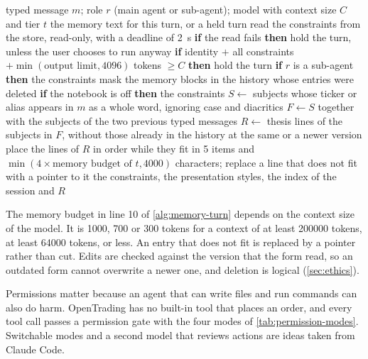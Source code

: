 \begin{algorithm}[H]
  \caption{Memory steps before the agent loop of one turn}\label{alg:memory-turn}
  \begin{algorithmic}[1]
    \Require typed message $m$; role $r$ (main agent or sub-agent); model with context size $C$ and tier $t$
    \Ensure the memory text for this turn, or a held turn
    \State read the constraints from the store, read-only, with a deadline of \qty{2}{\second}
    \State \textbf{if} the read fails \textbf{then} hold the turn, unless the user chooses to run anyway
    \State \textbf{if} identity $+$ all constraints $+ \min(\text{output limit}, \num{4096})$ tokens $\ge C$ \textbf{then} hold the turn
    \State \textbf{if} $r$ is a sub-agent \textbf{then} \Return the constraints
    \State mask the memory blocks in the history whose entries were deleted
    \State \textbf{if} the notebook is off \textbf{then} \Return the constraints
    \State $S \gets$ subjects whose ticker or alias appears in $m$ as a whole word, ignoring case and diacritics
    \State $F \gets S$ together with the subjects of the two previous typed messages
    \State $R \gets$ thesis lines of the subjects in $F$, without those already in the history at the same or a newer version
    \State place the lines of $R$ in order while they fit in \num{5} items and $\min(4 \times \text{memory budget of } t, \num{4000})$ characters; replace a line that does not fit with a pointer to it
    \State \Return the constraints, the presentation styles, the index of the session and $R$
  \end{algorithmic}
\end{algorithm}

The memory budget in line 10 of \cref{alg:memory-turn} depends on the context size of the model.
It is \num{1000}, \num{700} or \num{300} tokens for a context of at least \num{200000} tokens, at least \num{64000} tokens, or less.
An entry that does not fit is replaced by a pointer rather than cut.
Edits are checked against the version that the form read, so an outdated form cannot overwrite a newer one, and deletion is logical (\cref{sec:ethics}).

\label{sec:permissions}
Permissions matter because an agent that can write files and run commands can also do harm.
OpenTrading has no built-in tool that places an order, and every tool call passes a permission gate with the four modes of \cref{tab:permission-modes}.
Switchable modes \parencite{anthropicndmodes} and a second model that reviews actions \parencite{anthropic2026auto} are ideas taken from Claude Code.

